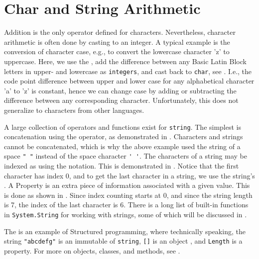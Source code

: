 \documentclass[fsharpNotes.tex]{subfiles}
\begin{document}
\section{Char and String Arithmetic}
Addition is the only operator defined for characters. Nevertheless, character arithmetic is often done by casting to an integer. A typical example is the conversion of character case, e.g., to convert the lowercase character 'z' to uppercase. Here, we use the , add the difference between any Basic Latin Block letters in upper- and lowercase as \lstinline{integers}, and cast back to \lstinline{char}, see .
%
%
I.e., the code point difference between upper and lower case for any alphabetical character 'a' to 'z' is constant, hence we can change case by adding or subtracting the difference between any corresponding character. Unfortunately, this does not generalize to characters from other languages.

A large collection of operators and functions exist for \lstinline{string}. The simplest is concatenation using the \lexeme{+} operator, as demonstrated in .
%
%
Characters and strings cannot be concatenated, which is why the above example used the string of a space \lstinline|" "| instead of the space character \lstinline|' '|. The characters of a string may be indexed as using the \idx[{[]}@\lstinline{[]}]{\lstinline{[]}} notation. This is demonstrated in .
%
%
Notice that the first character has index 0, and to get the last character in a string, we use the string's  . A Property is an extra piece of information associated with a given value. This is done as shown in .
%
%
Since index counting starts at 0, and since the string length is 7, the index of the last character is 6. 
There is a long list of built-in functions in \lstinline|System.String| for working with strings, some of which will be discussed in .
 
The  is an example of Structured programming, where technically speaking, the string \mbox{\lstinline|"abcdefg"|} is an immutable  of  \lstinline|string|, \lstinline|[]| is an object , and \lstinline|Length| is a property. For more on objects, classes, and methods, see .  
\end{document}
